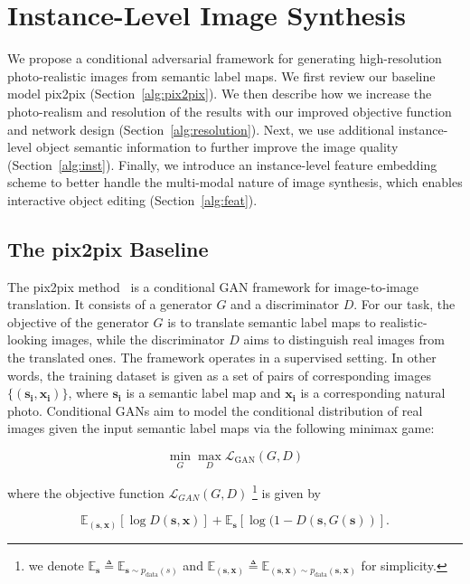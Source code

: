 \section{Instance-Level Image Synthesis}
\label{sec:alg}
We propose a conditional adversarial framework for generating high-resolution photo-realistic images from semantic label maps. We first review our baseline model pix2pix (Section~\ref{alg:pix2pix}). We then describe how we increase the photo-realism and resolution of the results with our improved objective function and network design (Section~\ref{alg:resolution}). Next, we use additional instance-level object semantic information to further improve the image quality (Section~\ref{alg:inst}). Finally, we introduce an instance-level feature embedding scheme to better handle the multi-modal nature of image synthesis, which enables interactive object editing (Section~\ref{alg:feat}).

\subsection{The pix2pix Baseline} \label{sec:alg:pix2pix}
The pix2pix method~\cite{isola2016image} is a conditional GAN framework for image-to-image translation. It consists of a generator $G$ and a discriminator $D$. For our task, the objective of the generator $G$ is to translate semantic label maps to realistic-looking images, while the discriminator $D$ aims to distinguish real images from the translated ones. The framework operates in a supervised setting. In other words, the training dataset is given as a set of pairs of corresponding images $\{(\mathbf{s_i},\mathbf{x_i})\}$, where $\mathbf{s_i}$ is a semantic label map and $\mathbf{x_i}$ is a corresponding natural photo. Conditional GANs aim to model the conditional distribution of real images given the input semantic label maps via the following minimax game:

\begin{equation}
\min_{G} \max_{D} \mathcal{L}_{\text{GAN}}(G,D)
\label{eqn::minimax}
\end{equation}

where the objective function $\mathcal{L}_{GAN}(G,D)$
\footnote{we denote $\mathbb{E}_{\mathbf{s}} \triangleq \mathbb{E}_{\mathbf{s}\sim p_{\text{data}}(s)}$ and $ \mathbb{E}_{(\mathbf{s},\mathbf{x})} \triangleq \mathbb{E}_{(\mathbf{s},\mathbf{x}) \sim p_{\text{data}}(\mathbf{s}, \mathbf{x})}$ for simplicity.} is given by

\begin{equation}
\mathbb{E}_{(\mathbf{s},\mathbf{x})}[\log D(\mathbf{s},\mathbf{x})]+ 
\mathbb{E}_{\mathbf{s}}[\log (1- D(\mathbf{s},G(\mathbf{s}))].
\label{eqn::gan_problem}
\end{equation}

